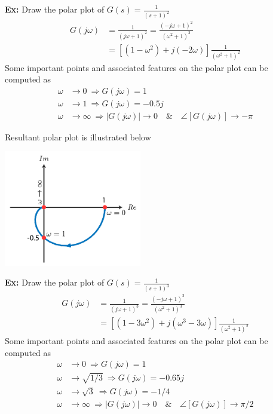 \documentclass{article}
\begin{document}
\vspace{6 pt}

\textbf{Ex:} Draw the polar plot of  $G(s) = \frac{1}{(s+1)^2}$
%
\begin{align*}
  G(j \omega ) &= \frac{1}{ (j \omega + 1)^2 } = \frac{ (-j \omega + 1)^2 }{( \omega^2 +1 )^2 }
\\
&= \left[ \left( 1 - \omega^2 \right) + j ( - 2 \omega) \right] \frac{1}{( \omega^2 +1 )^2 }
\end{align*}
%
Some important points and associated features on the polar plot can be computed as
\begin{align*}
  \omega &\to 0 \ \Rightarrow G(j \omega) = 1
\\
 \omega &\to 1 \ \Rightarrow G(j \omega) = -0.5 j 
\\
 \omega &\to  \infty \ \Rightarrow | G(j \omega) | \to 0 \quad \& \quad \angle  [ G(j \omega) ] \to -\pi
\end{align*}

Resultant polar plot is illustrated below

\vspace{6 pt}

  \begin{minipage}[h]{1\linewidth}
    \begin{center}
      \includegraphics[width=0.45\textwidth]{figs/polar4}
    \end{center}
  \end{minipage}

\vspace{6 pt}

\textbf{Ex:} Draw the polar plot of  $G(s) = \frac{1}{(s+1)^3}$
%
\begin{align*}
  G(j \omega ) &= \frac{1}{ (j \omega + 1)^3 } = \frac{ (-j \omega + 1)^3 }{( \omega^2 +1 )^3 }
\\
&= \left[ \left( 1 - 3 \omega^2 \right) + j (\omega^3 - 3 \omega) \right] \frac{1}{( \omega^2 +1 )^3 }
\end{align*}
%
Some important points and associated features on the polar plot can be computed as
\begin{align*}
  \omega &\to 0 \ \Rightarrow G(j \omega) = 1
\\
 \omega &\to \sqrt{1/3} \ \Rightarrow G(j \omega) = -0.65 j 
\\
 \omega &\to \sqrt{3} \ \Rightarrow G(j \omega) = -1/4 
\\
 \omega &\to  \infty \ \Rightarrow | G(j \omega) | \to 0 \quad \& \quad \angle  [ G(j \omega) ] \to \pi/2
\end{align*}
\end{document}
